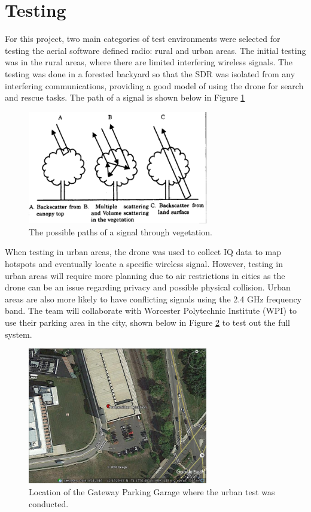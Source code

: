 \section{Testing}
For this project, two main categories of test environments were selected for testing the aerial software defined radio: rural and urban areas. The initial testing was in the rural areas, where there are limited interfering wireless signals. The testing was done in a forested backyard so that the SDR was isolated from any interfering communications, providing a good model of using the drone for search and rescue tasks. The path of a signal is shown below in Figure \ref{fig:tree}
\begin{figure}[ht!]
	\centering
	\includegraphics[width=0.70\textwidth]{img/Pathloss_tree}
	\caption{The possible paths of a signal through vegetation. \cite{backscatter}}
	\label{fig:tree}
\end{figure}\par
When testing in urban areas, the drone was used to collect IQ data to map hotspots and eventually locate a specific wireless signal. However, testing in urban areas will require more planning due to air restrictions in cities as the drone can be an issue regarding privacy and possible physical collision. Urban areas are also more likely to have conflicting signals using the 2.4 GHz frequency band. The team will collaborate with Worcester Polytechnic Institute (WPI) to use their parking area in the city, shown below in Figure \ref{fig:gateway} to test out the full system.\par

\begin{figure}[ht!]
	\centering
	\includegraphics[width=0.70\textwidth]{img/gateway_garage}
	\caption{Location of the Gateway Parking Garage where the urban test was conducted.}
	\label{fig:gateway}
\end{figure}\par


